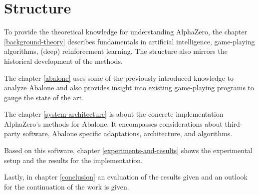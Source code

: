 \section{Structure}
To provide the theoretical knowledge for understanding AlphaZero, the chapter \ref{background-theory} describes fundamentals in artificial intelligence, game-playing algorithms, (deep) reinforcement learning. The structure also mirrors the historical development of the methods.

The chapter \ref{abalone} uses some of the previously introduced knowledge to analyze Abalone and also provides insight into existing game-playing programs to gauge the state of the art.

The chapter \ref{system-architecture} is about the concrete implementation AlphaZero's methods for Abalone. It encompasses considerations about third-party software, Abalone specific adaptations, architecture, and algorithms.

Based on this software, chapter \ref{experiments-and-results} shows the experimental setup and the results for the implementation.

Lastly, in chapter \ref{conclusion} an evaluation of the results given and an outlook for the continuation of the work is given.

